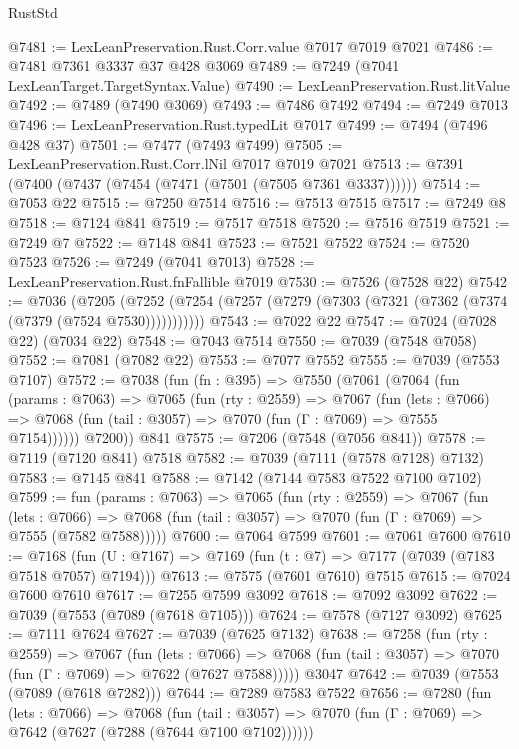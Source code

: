 \begin{lexlean}{RustStd}
\begin{coremodule}
@7481 := LexLeanPreservation.Rust.Corr.value @7017 @7019 @7021
@7486 := @7481 @7361 @3337 @37 @428 @3069
@7489 := @7249 (@7041 LexLeanTarget.TargetSyntax.Value)
@7490 := LexLeanPreservation.Rust.litValue
@7492 := @7489 (@7490 @3069)
@7493 := @7486 @7492
@7494 := @7249 @7013
@7496 := LexLeanPreservation.Rust.typedLit @7017
@7499 := @7494 (@7496 @428 @37)
@7501 := @7477 (@7493 @7499)
@7505 := LexLeanPreservation.Rust.Corr.lNil @7017 @7019 @7021
@7513 := @7391 (@7400 (@7437 (@7454 (@7471 (@7501 (@7505 @7361 @3337))))))
@7514 := @7053 @22
@7515 := @7250 @7514
@7516 := @7513 @7515
@7517 := @7249 @8
@7518 := @7124 @841
@7519 := @7517 @7518
@7520 := @7516 @7519
@7521 := @7249 @7
@7522 := @7148 @841
@7523 := @7521 @7522
@7524 := @7520 @7523
@7526 := @7249 (@7041 @7013)
@7528 := LexLeanPreservation.Rust.fnFallible @7019
@7530 := @7526 (@7528 @22)
@7542 := @7036
    (@7205 (@7252 (@7254 (@7257 (@7279 (@7303 (@7321 (@7362 (@7374 (@7379 (@7524 @7530)))))))))))
@7543 := @7022 @22
@7547 := @7024 (@7028 @22) (@7034 @22)
@7548 := @7043 @7514
@7550 := @7039 (@7548 @7058)
@7552 := @7081 (@7082 @22)
@7553 := @7077 @7552
@7555 := @7039 (@7553 @7107)
@7572 := @7038
    (fun (fn : @395) =>
    @7550
      (@7061
        (@7064
          (fun (params : @7063) =>
          @7065
            (fun (rty : @2559) =>
            @7067
              (fun (lets : @7066) =>
              @7068 (fun (tail : @3057) => @7070 (fun (Γ : @7069) => @7555 @7154))))))
        @7200))
    @841
@7575 := @7206 (@7548 (@7056 @841))
@7578 := @7119 (@7120 @841) @7518
@7582 := @7039 (@7111 (@7578 @7128) @7132)
@7583 := @7145 @841
@7588 := @7142 (@7144 @7583 @7522 @7100 @7102)
@7599 := fun (params : @7063) =>
  @7065
    (fun (rty : @2559) =>
    @7067
      (fun (lets : @7066) =>
      @7068 (fun (tail : @3057) => @7070 (fun (Γ : @7069) => @7555 (@7582 @7588)))))
@7600 := @7064 @7599
@7601 := @7061 @7600
@7610 := @7168 (fun (U : @7167) => @7169 (fun (t : @7) => @7177 (@7039 (@7183 @7518 @7057) @7194)))
@7613 := @7575 (@7601 @7610) @7515
@7615 := @7024 @7600 @7610
@7617 := @7255 @7599 @3092
@7618 := @7092 @3092
@7622 := @7039 (@7553 (@7089 (@7618 @7105)))
@7624 := @7578 (@7127 @3092)
@7625 := @7111 @7624
@7627 := @7039 (@7625 @7132)
@7638 := @7258
    (fun (rty : @2559) =>
    @7067
      (fun (lets : @7066) =>
      @7068 (fun (tail : @3057) => @7070 (fun (Γ : @7069) => @7622 (@7627 @7588)))))
    @3047
@7642 := @7039 (@7553 (@7089 (@7618 @7282)))
@7644 := @7289 @7583 @7522
@7656 := @7280
    (fun (lets : @7066) =>
    @7068
      (fun (tail : @3057) => @7070 (fun (Γ : @7069) => @7642 (@7627 (@7288 (@7644 @7100 @7102))))))

\end{coremodule}
\end{lexlean}

